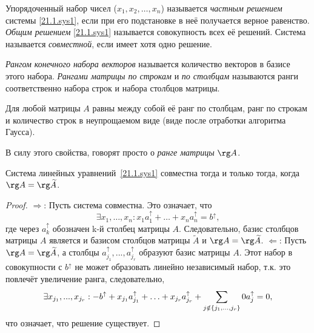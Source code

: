 \begin{defn}
Упорядоченный набор чисел ($x_1, x_2, \ldots, x_n$) называется \textit{частным решением} системы \eqref{21.1.sys1}, если при его подстановке в неё получается верное равенство. \textit{Общим решением} \eqref{21.1.sys1} называется совокупность всех её решений. Система называется \textit{совместной}, если имеет хотя одно решение.
\end{defn}
\begin{defn}
\textit{Рангом конечного набора векторов} называется количество векторов в базисе этого набора. \textit{Рангами матрицы по строкам} и \textit{по столбцам} называются ранги соответственно набора строк и набора столбцов матрицы.
\end{defn}
\begin{lemm} 
Для любой матрицы $A$ равны между собой её ранг по столбцам, ранг по строкам и количество строк в неупрощаемом виде (виде после отработки алгоритма Гаусса).
\end{lemm}
В силу этого свойства, говорят просто о \textit{ранге матрицы} $\rg A$.
\begin{thm}
Система линейных уравнений~\eqref{21.1.sys1} совместна тогда и только тогда, когда $\rg A = \rg \widetilde A$.
\end{thm}
\begin{proof}
$\Rightarrow$: Пусть система совместна. Это означает, что
\begin{equation*}
\exists x_1,\ldots, x_n: x_1a_1^\uparrow +\ldots+x_na_n^\uparrow=b^\uparrow,
\end{equation*}
где через $a_k^\uparrow$ обозначен k-й столбец матрицы $A$. Следовательно, базис столбцов матрицы $A$  является и базисом столбцов матрицы $\widetilde A$ и $\rg A = \rg \widetilde A$.
$\Leftarrow$: Пусть $\rg A = \rg \widetilde A$, а столбцы $a_{j_1}^\uparrow,...,a_{j_r}^\uparrow$ образуют базис матрицы $A$. Этот набор в совокупности с $b^\uparrow$ не может образовать линейно независимый набор, т.к. это повлечёт увеличение ранга, следовательно, 
\begin{equation*}\\ 
\exists x_{j_1},...,x_{j_r}: -b^\uparrow+x_{j_1}a_{j_1}^\uparrow+\ldots+x_{j_r}a_{j_r}^\uparrow+\sum_{j \notin \{j_1,...,j_r\}}0 a_j^\uparrow = 0,
\end{equation*} 
что означает, что решение существует.
\end{proof}
